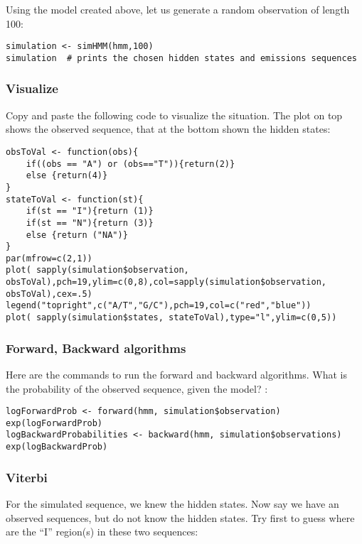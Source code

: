 \documentclass[a4paper,11pt]{article}
\begin{document}
Using the model created above, let us generate a random observation of length 100:

\begin{verbatim}
simulation <- simHMM(hmm,100)
simulation  # prints the chosen hidden states and emissions sequences
\end{verbatim}

\subsubsection{Visualize}

Copy and paste the following code to visualize the situation. The plot on top shows the observed sequence,
that at the bottom shown the hidden states:

\begin{verbatim}
obsToVal <- function(obs){
	if((obs == "A") or (obs=="T")){return(2)}
	else {return(4)}
}
stateToVal <- function(st){
	if(st == "I"){return (1)}
	if(st == "N"){return (3)}
	else {return ("NA")}
}
par(mfrow=c(2,1))
plot( sapply(simulation$observation, obsToVal),pch=19,ylim=c(0,8),col=sapply(simulation$observation, obsToVal),cex=.5)
legend("topright",c("A/T","G/C"),pch=19,col=c("red","blue"))
plot( sapply(simulation$states, stateToVal),type="l",ylim=c(0,5))
\end{verbatim}

\subsubsection{Forward, Backward algorithms}

Here are the commands to run the forward and backward algorithms. What is the probability of the observed sequence, given the model? :

\begin{verbatim}
logForwardProb <- forward(hmm, simulation$observation)
exp(logForwardProb)
logBackwardProbabilities <- backward(hmm, simulation$observations)
exp(logBackwardProb)
\end{verbatim}

\subsubsection{Viterbi}

For the simulated sequence, we knew the hidden states. Now say we have an observed sequences, but
do not know the hidden states. Try first to guess where are the ``I'' region(s) in these two sequences:
\end{document}
